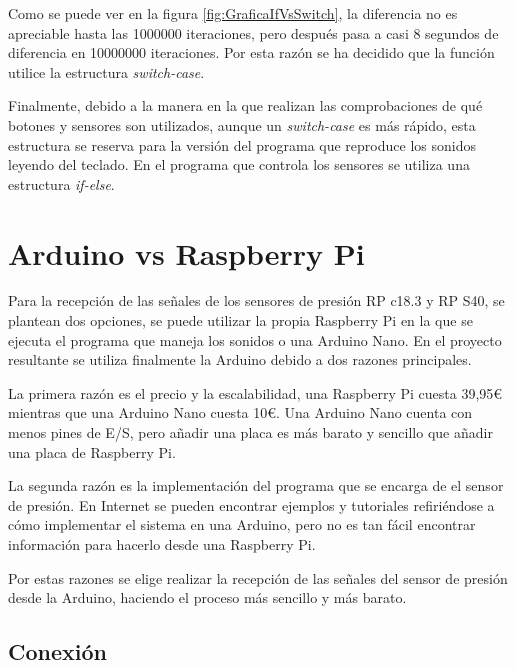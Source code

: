             Como se puede ver en la figura \ref{fig:GraficaIfVsSwitch}, la diferencia no es apreciable hasta las
            1000000 iteraciones, pero después pasa a casi 8 segundos de diferencia en 10000000 iteraciones. Por
            esta razón se ha decidido que la función utilice la estructura \textit{switch-case}.

            Finalmente, debido a la manera en la que realizan las comprobaciones de qué botones y sensores son
            utilizados, aunque un \textit{switch-case} es más rápido, esta estructura se reserva para la versión del
            programa que reproduce los sonidos leyendo del teclado. En el programa que controla los sensores se
            utiliza una estructura \textit{if-else}.



    \section{Arduino vs Raspberry Pi} %
    \label{sec:ArduinoVsRaspberryPi}

        Para la recepción de las señales de los sensores de presión RP c18.3 y RP S40, se plantean dos opciones, se
        puede utilizar la propia Raspberry Pi en la que se ejecuta el programa que maneja los sonidos o una Arduino
        Nano. En el proyecto resultante se utiliza finalmente la Arduino debido a dos razones principales.

        La primera razón es el precio y la escalabilidad, una Raspberry Pi cuesta 39,95\euro{} mientras que una
        Arduino Nano cuesta 10\euro{}. Una Arduino Nano cuenta con menos pines de E/S, pero añadir una placa es más
        barato y sencillo que añadir una placa de Raspberry Pi.

        La segunda razón es la implementación del programa que se encarga de el sensor de presión. En Internet se
        pueden encontrar ejemplos y tutoriales refiriéndose a cómo implementar el sistema en una Arduino, pero no
        es tan fácil encontrar información para hacerlo desde una Raspberry Pi.

        Por estas razones se elige realizar la recepción de las señales del sensor de presión desde la Arduino,
        haciendo el proceso más sencillo y más barato.

        \subsection{Conexión} %
        \label{sub:Conexion}


